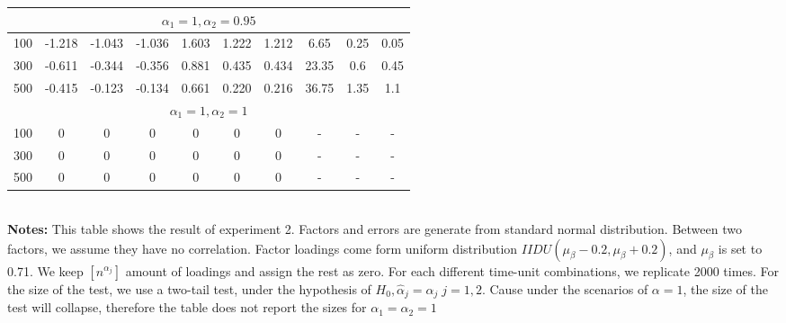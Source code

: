 \begin{table}[!hbt]
\begin{tabular}{lccccccccc}
\multicolumn{10}{c}{$\alpha_1 = 1, \alpha_2 = 0.95$}                                                                                                                             \\ \hline
\multicolumn{1}{l|}{100}                & -1.218 & -1.043 & \multicolumn{1}{c|}{-1.036} & 1.603  & 1.222 & \multicolumn{1}{c|}{1.212} & 6.65        & 0.25       & 0.05        \\
\multicolumn{1}{l|}{300}                & -0.611 & -0.344 & \multicolumn{1}{c|}{-0.356} & 0.881  & 0.435 & \multicolumn{1}{c|}{0.434} & 23.35       & 0.6        & 0.45        \\
\multicolumn{1}{l|}{500}                & -0.415 & -0.123 & \multicolumn{1}{c|}{-0.134} & 0.661  & 0.220 & \multicolumn{1}{c|}{0.216} & 36.75       & 1.35       & 1.1         \\ \hline
\multicolumn{10}{c}{$\alpha_1=1, \alpha_2 = 1$}                                                                                                                                  \\ \hline
\multicolumn{1}{l|}{100}                & 0      & 0      & \multicolumn{1}{c|}{0}      & 0      & 0     & \multicolumn{1}{c|}{0}     & -           & -          & -           \\
\multicolumn{1}{l|}{300}                & 0      & 0      & \multicolumn{1}{c|}{0}      & 0      & 0     & \multicolumn{1}{c|}{0}     & -           & -          & -           \\
\multicolumn{1}{l|}{500}                & 0      & 0      & \multicolumn{1}{c|}{0}      & 0      & 0     & \multicolumn{1}{c|}{0}     & -           & -          & -           \\ \hline\hline
	\end{tabular}
\bigskip\\
{\bf Notes:}
This table shows the result of  experiment 2.
Factors and errors are generate from standard normal distribution.
Between two factors, we assume they have no correlation.
Factor loadings come form uniform distribution $IIDU(\mu_{\beta} - 0.2, \mu_{\beta}+0.2)$, and $\mu_{\beta}$ is set to 0.71.
We keep  $[n^{\alpha_{j}}]$ amount of loadings and assign the rest as zero.
For each different time-unit combinations, we replicate 2000 times.
For the size of the test, we use a two-tail test, under the hypothesis of $H_0, \hat{\alpha}_j = \alpha_j\; j=1,2$.
Cause under the scenarios of $\alpha = 1$, the size of the test will collapse, therefore the table does not report the sizes for $\alpha_1 = \alpha_2 = 1$
\end{table}


